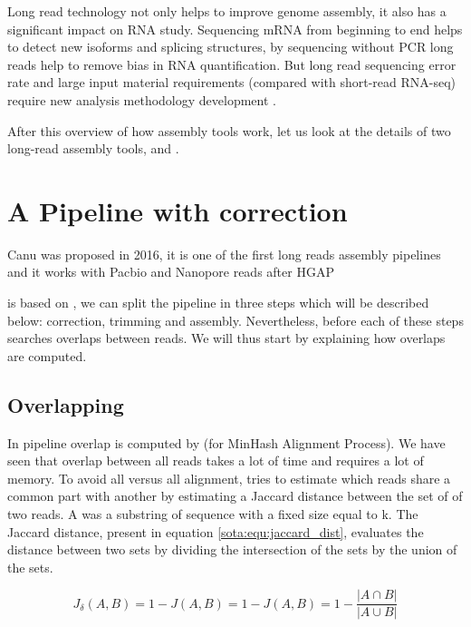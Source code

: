 \documentclass[main]{subfiles}
\begin{document}
Long read technology not only helps to improve genome assembly, it also has a significant impact on RNA study. Sequencing mRNA from beginning to end helps to detect new isoforms and splicing structures, by sequencing without PCR long reads help to remove bias in RNA quantification. But long read sequencing error rate and large input material requirements (compared with short-read RNA-seq) require new analysis methodology development \cite{review_lr_rna}. 

After this overview of how \OLC assembly tools work, let us look at the details of two long-read \OLC assembly tools, \canu and \miniasm.

\section{A Pipeline with correction \canu} \label{section:sota:canu}

Canu \cite{canu} was proposed in 2016, it is one of the first long reads assembly pipelines and it works with Pacbio and Nanopore reads after HGAP \cite{hgap}

\canu is based on  \cite{celera_first, celera_second}, we can split the \canu pipeline in three steps which will be described below: correction, trimming and assembly. Nevertheless, before each of these steps \canu searches overlaps between reads. We will thus start by explaining how overlaps are computed.

\subsection{Overlapping} \label{subsec:sota:canu:overlapping}

In \canu pipeline overlap is computed by \mhap (for MinHash Alignment Process). We have seen that overlap between all reads takes a lot of time and requires a lot of memory. To avoid all versus all alignment, \mhap tries to estimate which reads share a common part with another by estimating a Jaccard distance between the set of \kmers of two reads. A \kmer was a substring of sequence with a fixed size equal to k. The Jaccard distance, present in equation \ref{sota:equ:jaccard_dist}, evaluates the distance between two sets by dividing the intersection of the sets by the union of the sets.

\begin{equation}
J_{\delta}(A,B) = 1 - J(A,B) = 1 -  J(A,B) = 1 - \frac{|A \cap B|}{|A \cup B|}
\label{sota:equ:jaccard_dist}
\end{equation}
\end{document}
